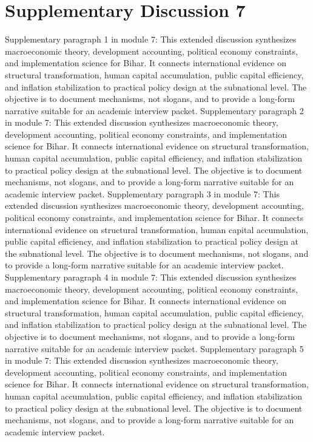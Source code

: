 \documentclass[preprint,12pt]{elsarticle}
\begin{document}
\section{Supplementary Discussion 7}
Supplementary paragraph 1 in module 7: This extended discussion synthesizes macroeconomic theory, development accounting, political economy constraints, and implementation science for Bihar. It connects international evidence on structural transformation, human capital accumulation, public capital efficiency, and inflation stabilization to practical policy design at the subnational level. The objective is to document mechanisms, not slogans, and to provide a long-form narrative suitable for an academic interview packet.
Supplementary paragraph 2 in module 7: This extended discussion synthesizes macroeconomic theory, development accounting, political economy constraints, and implementation science for Bihar. It connects international evidence on structural transformation, human capital accumulation, public capital efficiency, and inflation stabilization to practical policy design at the subnational level. The objective is to document mechanisms, not slogans, and to provide a long-form narrative suitable for an academic interview packet.
Supplementary paragraph 3 in module 7: This extended discussion synthesizes macroeconomic theory, development accounting, political economy constraints, and implementation science for Bihar. It connects international evidence on structural transformation, human capital accumulation, public capital efficiency, and inflation stabilization to practical policy design at the subnational level. The objective is to document mechanisms, not slogans, and to provide a long-form narrative suitable for an academic interview packet.
Supplementary paragraph 4 in module 7: This extended discussion synthesizes macroeconomic theory, development accounting, political economy constraints, and implementation science for Bihar. It connects international evidence on structural transformation, human capital accumulation, public capital efficiency, and inflation stabilization to practical policy design at the subnational level. The objective is to document mechanisms, not slogans, and to provide a long-form narrative suitable for an academic interview packet.
Supplementary paragraph 5 in module 7: This extended discussion synthesizes macroeconomic theory, development accounting, political economy constraints, and implementation science for Bihar. It connects international evidence on structural transformation, human capital accumulation, public capital efficiency, and inflation stabilization to practical policy design at the subnational level. The objective is to document mechanisms, not slogans, and to provide a long-form narrative suitable for an academic interview packet.
\end{document}
